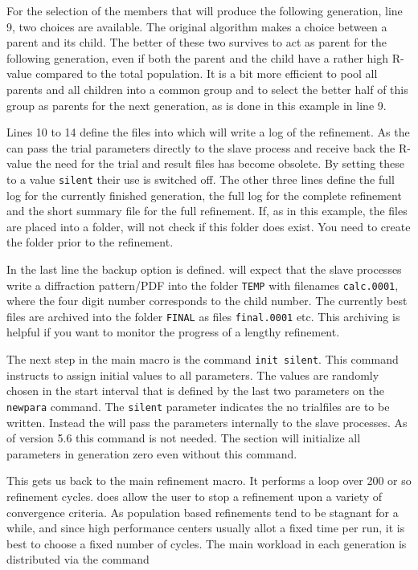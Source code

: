 For the selection of the members that will produce the following generation,
line 9, two choices are available. The original algorithm makes a choice between
a parent and its child. The better of these two survives to act as parent for the
following generation, even if both the parent and the child have a rather high
R-value compared to the total population. It is a bit more efficient to pool 
all parents and all children into a common group and to select the better half 
of this group as parents for the next generation, as is done in this example in
line 9.

Lines 10 to 14 define the files into which \Diffev will write a log of the 
refinement. As the \Suite can pass the trial parameters directly to the slave 
process and receive back the R-value the need for the trial and result files
has become obsolete. By setting these to a value {\tt silent} their use is 
switched off. The other three lines define the full log for the currently
finished generation, the full log for the complete refinement and the short
summary file for the full refinement. If, as in this example, the files are 
placed into a folder, \Diffev will not check if this folder does exist. You
need to create the folder prior to the refinement. 

In the last line the backup option is defined. \Diffev will expect that the 
slave processes write a diffraction pattern/PDF into the folder {\tt TEMP}
with filenames {\tt calc.0001}, where the four digit number corresponds to the
child number. The currently best files are archived into the folder 
{\tt FINAL} as files {\tt final.0001} etc. This archiving is helpful if you
want to monitor the progress of a lengthy refinement.

The next step in the main macro is the command {\tt init silent}. This command
instructs \Diffev to assign initial values to all parameters. The values are
randomly chosen in the start interval that is defined by the last two 
parameters on the {\tt newpara} command. The {\tt silent} parameter indicates
the no trialfiles are to be written. Instead the \Suite will pass the parameters 
internally to the slave processes. As of version 5.6 this command is not needed.
The \Diffev section will initialize all parameters in generation zero even 
without this command.

This gets us back to the main refinement macro. It performs a loop over 200
or so refinement cycles. \Diffev does allow the user to stop a refinement
upon a variety of convergence criteria. As population based refinements tend
to be stagnant for a while, and since high performance centers usually 
allot a fixed time per run, it is best to choose a fixed number of cycles.
The main workload in each generation is distributed via the command

